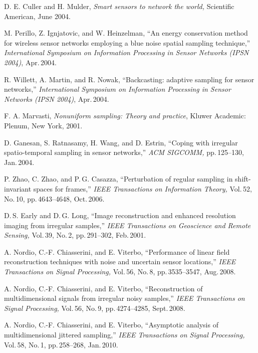 \documentclass[11pt, draftcls, onecolumn, a4paper]{IEEEtran}
\begin{document}
\begin{thebibliography}{99}

  D. E. Culler and H. Mulder, 
{\em Smart sensors to network the world,} 
Scientific American, June 2004.

 M. Perillo, Z. Ignjatovic, and W. Heinzelman, ``An 
energy conservation method for wireless sensor networks employing a blue 
noise spatial sampling technique,'' {\em International Symposium on 
Information Processing in Sensor Networks (IPSN 2004)}, Apr.\,2004.

 R. Willett, A. Martin, and R. Nowak, ``Backcasting: 
adaptive sampling for sensor networks,'' {\em International 
Symposium on Information Processing in Sensor Networks (IPSN 2004)}, 
Apr.\,2004.

F. A. Marvasti, {\em Nonuniform sampling: Theory and practice},
Kluwer Academic: Plenum, New York, 2001.

 D. Ganesan, S. Ratnasamy, H. Wang, and D. Estrin,
  ``Coping with irregular spatio-temporal sampling in sensor
  networks,'' {\em ACM SIGCOMM,} pp.\,125--130, Jan.\,2004.

P. Zhao, C. Zhao, and P.\,G. Casazza, 
``Perturbation of regular sampling in shift-invariant spaces 
for frames,''
{\em IEEE Transactions on Information Theory,} Vol.\,52, No.\,10, pp.\,4643--4648,
Oct.\,2006.

D.\,S. Early and D.\,G. Long, ``Image reconstruction and enhanced resolution
imaging from irregular samples,'' {\em IEEE Transactions on Geoscience and Remote Sensing,}
Vol.\,39, No.\,2, pp.\,291--302, Feb.\,2001.


 A. Nordio, C.-F. Chiasserini, and E. Viterbo,
  ``Performance of linear field reconstruction techniques with noise
  and uncertain sensor locations,'' {\em IEEE Transactions on Signal
    Processing,} Vol.\,56, No.\,8, pp.\,3535--3547, Aug.\,2008.

 A. Nordio, C.-F. Chiasserini, and E. Viterbo,
  ``Reconstruction of multidimensional signals from irregular noisy
  samples,'' {\em IEEE Transactions on Signal Processing,} Vol.\,56,
  No.\,9, pp.\,4274--4285, Sept.\,2008.

 A. Nordio, C.-F. Chiasserini, and E. Viterbo,
  ``Asymptotic analysis of multidimensional jittered sampling,'' {\em
  IEEE Transactions on Signal Processing,} Vol.\,58, No.\,1, 
pp.\,258--268, Jan.\,2010.


\end{thebibliography}
\end{document}
